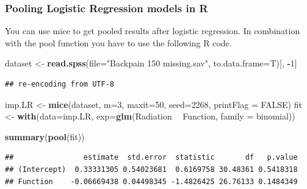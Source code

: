 \documentclass[]{book}
\newenvironment{Shaded}{\begin{snugshade}}{\end{snugshade}}
\newcommand{\KeywordTok}[1]{\textcolor[rgb]{0.13,0.29,0.53}{\textbf{#1}}}
\newcommand{\DataTypeTok}[1]{\textcolor[rgb]{0.13,0.29,0.53}{#1}}
\newcommand{\DecValTok}[1]{\textcolor[rgb]{0.00,0.00,0.81}{#1}}
\newcommand{\StringTok}[1]{\textcolor[rgb]{0.31,0.60,0.02}{#1}}
\newcommand{\CommentTok}[1]{\textcolor[rgb]{0.56,0.35,0.01}{\textit{#1}}}
\newcommand{\OtherTok}[1]{\textcolor[rgb]{0.56,0.35,0.01}{#1}}
\newcommand{\OperatorTok}[1]{\textcolor[rgb]{0.81,0.36,0.00}{\textbf{#1}}}
\newcommand{\NormalTok}[1]{#1}
\theoremstyle{definition}
\theoremstyle{definition}
\theoremstyle{definition}
\theoremstyle{remark}
\begin{document}
\subsubsection{Pooling Logistic Regression models in
R}\label{pooling-logistic-regression-models-in-r}

You can use mice to get pooled results after logistic regression. In
combination with the pool function you have to use the following R code.

\begin{Shaded}
\begin{Highlighting}[]
\NormalTok{dataset <-}\StringTok{ }\KeywordTok{read.spss}\NormalTok{(}\DataTypeTok{file=}\StringTok{"Backpain 150 missing.sav"}\NormalTok{, }\DataTypeTok{to.data.frame=}\NormalTok{T)[, }\OperatorTok{-}\DecValTok{1}\NormalTok{]}
\end{Highlighting}
\end{Shaded}

\begin{verbatim}
## re-encoding from UTF-8
\end{verbatim}

\begin{Shaded}
\begin{Highlighting}[]
\NormalTok{imp.LR <-}\StringTok{ }\KeywordTok{mice}\NormalTok{(dataset, }\DataTypeTok{m=}\DecValTok{3}\NormalTok{, }\DataTypeTok{maxit=}\DecValTok{50}\NormalTok{, }\DataTypeTok{seed=}\DecValTok{2268}\NormalTok{, }\DataTypeTok{printFlag =} \OtherTok{FALSE}\NormalTok{)}
\NormalTok{fit <-}\StringTok{ }\KeywordTok{with}\NormalTok{(}\DataTypeTok{data=}\NormalTok{imp.LR, }\DataTypeTok{exp=}\KeywordTok{glm}\NormalTok{(Radiation }\OperatorTok{~}\StringTok{ }\NormalTok{Function, }\DataTypeTok{family =}\NormalTok{ binomial))}

\KeywordTok{summary}\NormalTok{(}\KeywordTok{pool}\NormalTok{(fit))}
\end{Highlighting}
\end{Shaded}

\begin{verbatim}
##                estimate  std.error  statistic       df   p.value
## (Intercept)  0.33331305 0.54023681  0.6169758 30.48361 0.5418318
## Function    -0.06669438 0.04498345 -1.4826425 26.76133 0.1484349
\end{verbatim}

\begin{Shaded}
\end{Shaded}
\end{document}
